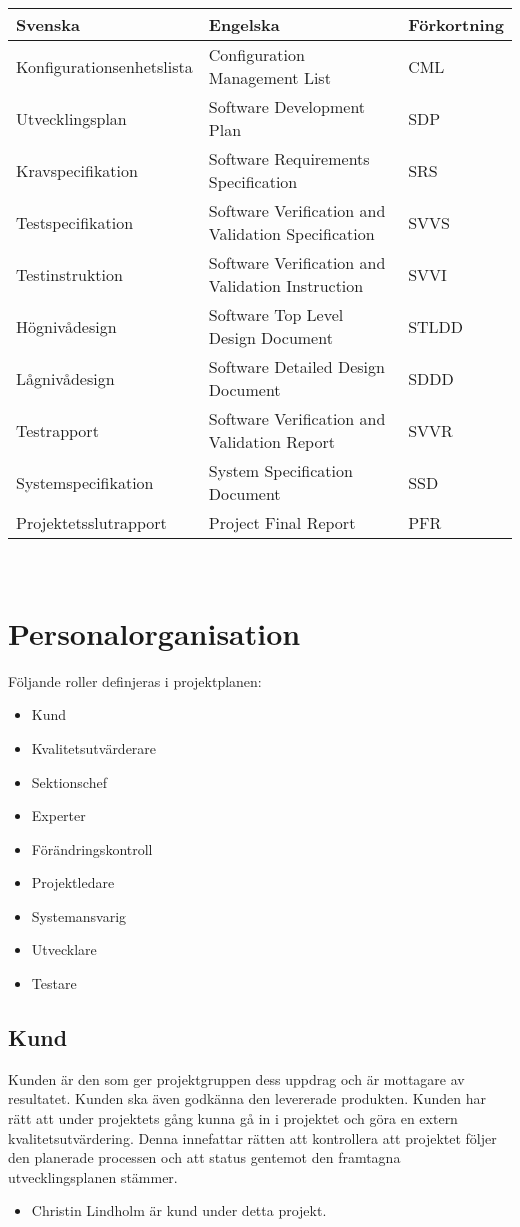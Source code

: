 \documentclass[paper=a4, fontsize=11pt,twoside]{article}
\begin{document}
\begin{tabular}{| l | l | l |}
\hline
\textbf{Svenska} & \textbf{Engelska} & \textbf{Förkortning} \\
\hline
\hline
 Konfigurationsenhetslista & Configuration Management List & CML \\
 \hline
Utvecklingsplan	 & Software Development Plan & SDP \\
\hline
Kravspecifikation & Software Requirements Specification & SRS \\
\hline
Testspecifikation & Software Verification and Validation Specification & SVVS \\
\hline
Testinstruktion & Software Verification and Validation Instruction & SVVI \\
\hline
Högnivådesign & Software Top Level Design Document & STLDD \\
\hline
Lågnivådesign & Software Detailed Design Document & SDDD \\
\hline
Testrapport & Software Verification and Validation Report & SVVR \\
\hline
Systemspecifikation & System Specification Document & SSD \\
\hline
Projektetsslutrapport & Project Final Report & PFR \\
\hline
\end{tabular}\\

\section{Personalorganisation}
Följande roller definjeras i projektplanen: 
\begin{itemize}
\item Kund
\item Kvalitetsutvärderare
\item Sektionschef
\item Experter
\item Förändringskontroll
\item Projektledare
\item Systemansvarig
\item Utvecklare
\item Testare
\end{itemize}

\subsection*{Kund}
Kunden är den som ger projektgruppen dess uppdrag och är mottagare av resultatet. Kunden ska även godkänna den levererade produkten. Kunden har rätt att under projektets gång kunna gå in i projektet och göra en extern kvalitetsutvärdering. Denna innefattar rätten att kontrollera att projektet följer den planerade processen och att status gentemot den framtagna utvecklingsplanen stämmer. 
\begin{itemize}
\item Christin Lindholm är kund under detta projekt. 
\end{itemize}
\end{document}
